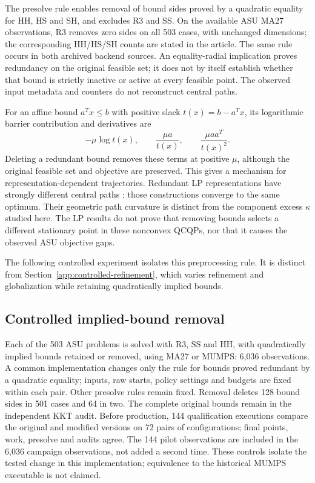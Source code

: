 \documentclass[pdflatex,sn-mathphys-num]{sn-jnl}
\theoremstyle{thmstyleone}
\theoremstyle{thmstylethree}
\begin{document}
The presolve rule enables removal of bound sides proved by a quadratic
equality for HH, HS and SH, and excludes R3 and SS. On the available
ASU MA27 observations, R3 removes zero sides on all 503 cases, with
unchanged dimensions; the corresponding HH/HS/SH counts are stated in
the article. The same rule occurs in both archived backend sources.
An equality-radial implication proves redundancy on the original feasible
set; it does not by itself establish whether that bound is strictly
inactive or active at every feasible point. The observed input metadata
and counters do not reconstruct central paths.

For an affine bound $a^Tx\leq b$ with positive slack $t(x)=b-a^Tx$, its
logarithmic barrier contribution and derivatives are
\[
 -\mu\log t(x),\qquad
 \frac{\mu a}{t(x)},\qquad
 \frac{\mu aa^T}{t(x)^2}.
\]
Deleting a redundant bound removes these terms at positive $\mu$, although
the original feasible set and objective are preserved. This gives a
mechanism for representation-dependent trajectories. Redundant LP
representations have strongly different central paths
\citep{DezaNematollahiTerlaky2008,NematollahiTerlaky2008Touching}; those
constructions converge to the same optimum. Their geometric path curvature
is distinct from the component excess $\kappa$ studied here. The LP results
do not prove that removing bounds selects a different stationary point
in these nonconvex QCQPs, nor that it causes the observed ASU objective gaps.

The following controlled experiment isolates this preprocessing rule.
It is distinct from Section~\ref{app:controlled-refinement}, which varies
refinement and globalization while retaining quadratically implied bounds.

\subsection{Controlled implied-bound removal}\label{supp:asu-bounds}
Each of the 503 ASU problems is solved with R3, SS and HH, with
quadratically implied bounds retained or removed, using MA27 or MUMPS:
6,036 observations.
A common implementation changes only the rule for bounds proved redundant
by a quadratic equality; inputs, raw starts, policy settings and budgets
are fixed within each pair. Other presolve rules remain fixed. Removal
deletes 128 bound sides in 501 cases and 64 in two. The complete original
bounds remain in the independent KKT audit. Before production,
144 qualification executions compare the original and modified versions on
72 pairs of configurations; final points, work, presolve and audits agree.
The 144 pilot observations are included in the 6,036 campaign observations,
not added a second time. These controls isolate the tested change in this
implementation; equivalence to the historical MUMPS executable is not claimed.
\end{document}
